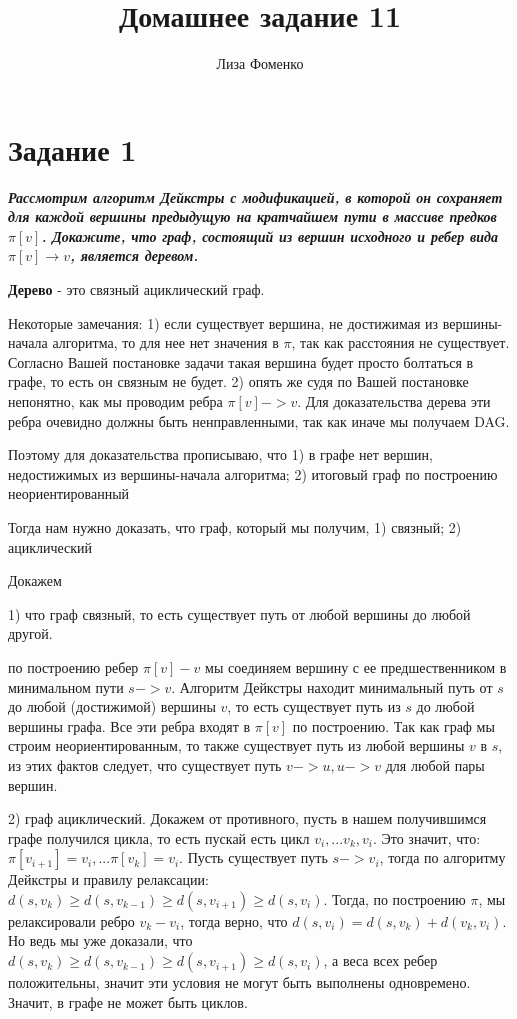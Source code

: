 \documentclass{article}
\title{Домашнее задание 11}
\author{Лиза Фоменко}
\date{}
\begin{document}
\maketitle


\section*{\textbf{Задание 1}} \textbf{\textit{Рассмотрим алгоритм Дейкстры с модификацией, в которой он сохраняет для каждой вершины предыдущую на кратчайшем пути в массиве предков $\pi[v]$. Докажите, что граф, состоящий из вершин исходного и ребер вида $\pi[v] \rightarrow v$, является деревом.}}

\textbf{Дерево} - это связный ациклический граф.

Некоторые замечания: 1) если существует вершина, не достижимая из вершины-начала алгоритма, то для нее нет значения в $\pi$, так как расстояния не существует. Согласно Вашей постановке задачи такая вершина будет просто болтаться в графе, то есть он связным не будет. 2) опять же судя по Вашей постановке непонятно, как мы проводим ребра $\pi[v] -> v$.  Для доказательства дерева эти ребра очевидно должны быть ненправленными, так как иначе мы получаем DAG.

Поэтому для доказательства прописываю, что 1) в графе нет вершин, недостижимых из вершины-начала алгоритма; 2) итоговый граф по построению неориентированный

Тогда нам нужно доказать, что граф, который мы получим, 1) связный; 2) ациклический

Докажем

1) что граф связный, то есть существует путь от любой вершины до любой другой.

по построению ребер $\pi[v] - v$ мы соединяем вершину с ее предшественником в минимальном пути $s -> v$. Алгоритм Дейкстры находит минимальный путь от $s$ до любой (достижимой) вершины $v$, то есть существует путь из $s$ до любой вершины графа. Все эти ребра входят в $\pi[v]$ по построению. Так как граф мы строим неориентированным, то также существует путь из любой вершины $v$ в $s$, из этих фактов следует, что существует путь $v - > u, u - > v$ для любой пары вершин.

2) граф ациклический. Докажем от противного, пусть в нашем получившимся графе получился цикла, то есть пускай есть цикл $v_i, ... v_k, v_i$. Это значит, что: $\pi[v_{i+1}] = v_i, ... \pi[v_{k}] = v_i$. Пусть существует путь $s -> v_i$, тогда по алгоритму Дейкстры и правилу релаксации: $d(s, v_k) \geq d(s, v_{k-1}) \geq d(s, v_{i+1}) \geq d(s, v_i)$. Тогда, по построению $\pi$, мы релаксировали ребро $v_k - v_i$, тогда верно, что $d(s, v_i) = d(s, v_k) + d(v_k, v_i)$. Но ведь мы уже доказали, что $d(s, v_k) \geq d(s, v_{k-1}) \geq d(s, v_{i+1}) \geq d(s, v_i)$, а веса всех ребер положительны, значит эти условия не могут быть выполнены одновремено. Значит, в графе не может быть циклов.
\end{document}
